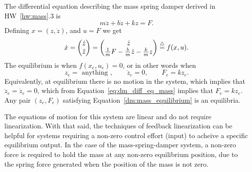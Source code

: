 
The differential equation describing the mass spring damper derived in HW~\ref{hw:mass}.3 is
\begin{equation}\label{eq:dm_diff_eq_mass}
  m \ddot{z} + b \dot{z} + kz = F .
\end{equation}
Defining $x=(z, \dot{z})$, and $u=F$ we get
\begin{align*}
\dot{x} = \begin{pmatrix} \dot{z} \\ \ddot{z}\end{pmatrix} 
= \begin{pmatrix} \dot{z} \\ \frac{1}{m}F - \frac{b}{m}\dot{z} - \frac{k}{m}z \end{pmatrix} \stackrel{\triangle}{=} f(x,u).
\end{align*}
The equilibrium is when $f(x_e,u_e)=0$, or in other words when
\begin{equation}\label{dm:mass_equilibrium}
z_e = \text{~anything~}, \qquad \dot{z}_e =0, \qquad F_e = k z_e.
\end{equation}
Equivalently, at equilibrium there is no motion in the system, which implies that $\ddot{z}_e = \dot{z}_e=0$, which from Equation~\eqref{eq:dm_diff_eq_mass} implies that $F_e = k z_e$. Any pair $(z_e, F_e)$ satisfying Equation~\eqref{dm:mass_equilibrium} is an equilibria.  

The equations of motion for this system are linear and do not require linearization. With that said, the techniques of feedback linearization can be helpful for systems requiring a non-zero control effort (input) to acheive a specific equilibrium output. In the case of the mass-spring-damper system, a non-zero force is required to hold the mass at any non-zero equilibrium position, due to the spring force generated when the position of the mass is not zero.


